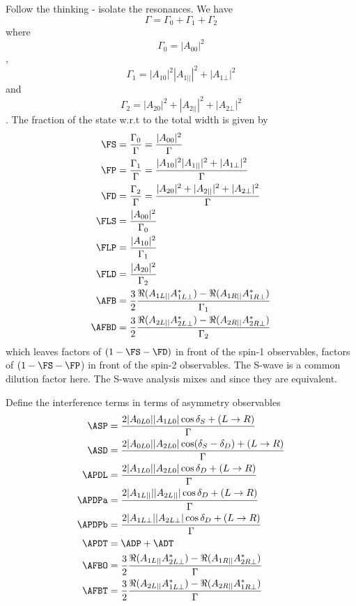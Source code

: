 Follow the \BdToKstmm thinking - isolate the resonances. We have
$$ \Gamma = \Gamma_0 + \Gamma_1 + \Gamma_2 $$
where
$$ \Gamma_0 = |A_{00}|^2 $$, $$ \Gamma_1 = |A_{10}|^2 |A_{1||}|^2 + |A_{1\bot}|^2$$ and $$ \Gamma_2 = |A_{20}|^2 + |A_{2||}|^2 + |A_{2\bot}|^2 $$.
The fraction of the state w.r.t to the total width is given by
\begin{subequations}\begin{align}
\FS & = \frac{\Gamma_0}{\Gamma} = \frac{|A_{00}|^2}{\Gamma} \\
\FP & = \frac{\Gamma_1}{\Gamma} = \frac{|A_{10}|^2 |A_{1||}|^2 + |A_{1\bot}|^2}{\Gamma} \\
\FD & = \frac{\Gamma_2}{\Gamma} = \frac{|A_{20}|^2 + |A_{2||}|^2 + |A_{2\bot}|^2 }{\Gamma} \\
\FLS & =  \frac{|A_{00}|^2}{\Gamma_0}  \\
\FLP & = \frac{|A_{10}|^2}{\Gamma_1} \\
\FLD & = \frac{|A_{20}|^2}{\Gamma_2} \\
\AFB &=  \frac{3}{2} \frac{ \Re( A_{1L||}A_{1L\bot}^{*}) -\Re( A_{1R||} A_{1R\bot}^{*})}{\Gamma_1} \\
\AFBD &= \frac{3}{2} \frac{ \Re( A_{2L||}A_{2L\bot}^{*}) -\Re( A_{2R||} A_{2R\bot}^{*})}{\Gamma_2}
\end{align}\end{subequations}
which leaves factors of $(1-\FS-\FD)$ in front of the spin-1 observables, factors of $(1-\FS-\FP$) in front of the spin-2 observables.
The S-wave is a common dilution factor here.
The S-wave analysis mixes \FS and \FLS since they are equivalent.



Define the interference terms in terms of asymmetry observables
\begin{align}
\ASP &=  \frac{2|A_{0L0}||A_{1L0}|\cos\delta_S  + ( L \to R )}{\Gamma} \\
\ASD &= \frac{ 2|A_{0L0}||A_{2L0}|\cos(\delta_S - \delta_D)  + ( L \to R )}{\Gamma} \\
\APDL &= \frac{2|A_{1L0}||A_{2L0}|\cos\delta_D  + ( L \to R )}{\Gamma} \\
\APDPa &= \frac{2|A_{1L||}||A_{2L||}| \cos\delta_D + ( L \to R )}{\Gamma} \\
\APDPb &= \frac{2|A_{1L\bot}||A_{2L\bot}| \cos\delta_D +  ( L \to R )}{\Gamma}   \\
\APDT &=  \ADP + \ADT \\
\AFBO &= \frac{3}{2} \frac{ \Re( A_{1L||}A_{2L\bot}^{*}) -\Re( A_{1R||} A_{2R\bot}^{*})}{\Gamma}   \\
\AFBT &= \frac{3}{2} \frac{ \Re( A_{2L||}A_{1L\bot}^{*}) -\Re( A_{2R||} A_{1R\bot}^{*})}{\Gamma} 
\end{align}

